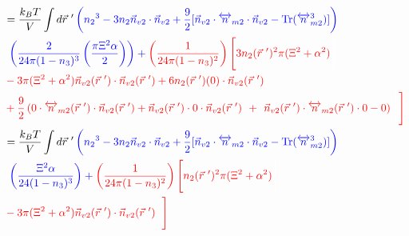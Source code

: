 \documentclass[double,12pt]{revtex4-2}
\begin{document}
\begin{align} %
%
&=\frac{k_BT}{V}\int d\vec r~' \color{blue}\left( {n_2}^3-3n_2
    \vec{n}_{v2}\cdot\vec{n}_{v2} 
     +\frac{9}{2}[\vec{n}_{v2}\cdot{\overleftrightarrow{n}_{m2}}\cdot{
     \vec{n}_{v2}}-\operatorname{Tr}({\overleftrightarrow{n}^3_{m2}})]
     \right) \nonumber\\
     & \color{blue}~\left(\frac{2}{24\pi(1-n_3)^3}\left(\frac{\pi\Xi^2\alpha}{2}\right)
     \right) +\color{red} \left(\frac{1}{24\pi(1-n_3)^2}\right)\Bigg[3n_2(\vec r~')^2
     \pi(\Xi^2 + \alpha^2) \color{white}\Bigg] \nonumber\\
     &\color{red}- 3\pi(\Xi^2 + \alpha^2)\vec n_{v2}(\vec r~') \cdot \vec n_{v2}
     (\vec r~') + 6n_2(\vec r~')(0)\cdot \vec n_{v2}(\vec r~')\nonumber \\
     &\color{red}+\frac{9}{2}\left(0\cdot \overleftrightarrow n_{m2}(\vec r~')\cdot 
     \vec n_{v2}( \vec r~')+\vec n_{v2}(\vec r~')\cdot 0 \cdot \vec n_{v2}
     (\vec r~')\color{white}\right)+ \color{white}\left(\color{black}\color{red}
     \vec n_{v2}(\vec r~')\cdot\overleftrightarrow n_{m2}(\vec r~')
     \cdot 0-0\right) 
     \color{white}\Bigg[\color{black}\color{red}\Bigg] \\
%
&=\frac{k_BT}{V}\int d\vec r~' \color{blue}\left({n_2}^3-3n_2
   \vec{n}_{v2}\cdot\vec{n}_{v2} 
    +\frac{9}{2}[\vec{n}_{v2}\cdot{\overleftrightarrow{n}_{m2}}\cdot{
    \vec{n}_{v2}}-\operatorname{Tr}({\overleftrightarrow{n}^3_{m2}})]
    \right) \nonumber\\
    &\color{blue}~\left(\frac{\Xi^2\alpha}{24(1-n_3)^3}
    \right) + \color{black}\color{red}\left(\frac{1}{24\pi(1-n_3)^2}\right)\Bigg[\color{white}
    \color{red}n_2(\vec r~')^2
    \pi(\Xi^2 + \alpha^2) \color{white}\Bigg] \\
    &\color{red}- 3\pi(\Xi^2 + \alpha^2)\vec n_{v2}
    (\vec r~') \cdot \vec n_{v2}(\vec r~')
    \color{white}\Bigg[\color{black}\color{red}\Bigg]
\end{align}
\end{document}
